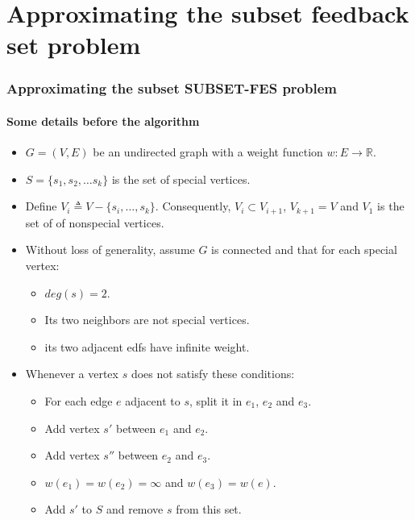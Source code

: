 \documentclass[10pt]{beamer}
\begin{document}
\section{Approximating the subset feedback set problem}
\begin{frame}
\frametitle{Approximating the subset SUBSET-FES problem}
\framesubtitle{Some details before the algorithm}
\begin{itemize}
    \item \(G = (V, E)\) be an undirected graph with a weight function \(w : E \rightarrow \mathbb{R}\).
    \item \(S = \{s_1, s_2, \ldots s_k\}\) is the set of special vertices.
    \item Define \(V_i \triangleq V - \{s_i, \ldots, s_k\} \). Consequently, \(V_i \subset V_{i+1}\), \(V_{k+1} = V \) and \(V_1\) is the set of of nonspecial vertices.
    \item Without loss of generality, assume \(G\) is connected and that for each special vertex:
    \begin{itemize}
        \item \(deg(s) = 2\).
        \item Its two neighbors are not special vertices.
        \item its two adjacent edfs have infinite weight.
    \end{itemize}
    \item Whenever a vertex \(s\) does not satisfy these conditions:
    \begin{itemize}
        \item For each edge \(e\) adjacent to \(s\), split it in \(e_1\), \(e_2\) and \(e_3\).
        \item Add vertex \(s'\) between \(e_1\) and \(e_2\).
        \item Add vertex \(s''\) between \(e_2\) and \(e_3\).
        \item \(w(e_1) = w(e_2) = \infty\) and \(w(e_3) = w(e)\).
        \item Add \(s'\) to \(S\) and remove \(s\) from this set.
    \end{itemize}
\end{itemize}
\end{frame}
\end{document}

